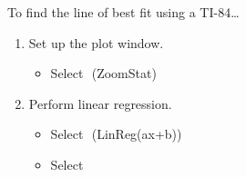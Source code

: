 \begin{minipage}[t]{0.5\textwidth}
\begin{myConcept}{To find the line of best fit using a {\scshape TI-84}\dots}
\begin{enumerate}
\begin{itemize}
            \end{itemize}
        \item Set up the plot window.
            \begin{itemize}
                \item Select 
                    \,\,{\footnotesize\ttfamily (ZoomStat)}
            \end{itemize}
        \item Perform linear regression.
            \begin{itemize}
                \item Select 
                    \,\,{(\small\ttfamily LinReg(ax+b))}
                \item Select 
            \end{itemize}
    \end{enumerate}
\end{myConcept}
\end{minipage}

